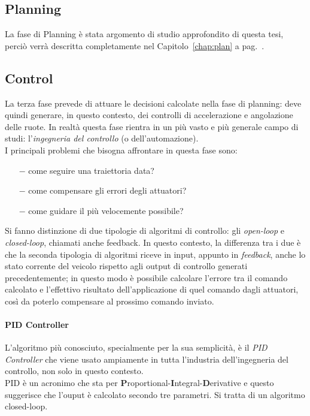 \subsection{Planning}
La fase di Planning è stata argomento di studio approfondito di questa tesi, perciò verrà descritta
completamente nel Capitolo~\ref{chap:plan} a pag.~\pageref{chap:plan}.

\subsection{Control}
La terza fase prevede di attuare le decisioni calcolate nella fase di planning: deve quindi generare, in
questo contesto, dei controlli di accelerazione e angolazione delle ruote. In realtà questa fase rientra
in un più vasto e più generale campo di studi: l'\textit{ingegneria del controllo} (o dell'automazione).\\
I principali problemi che bisogna affrontare in questa fase sono:
\begin{itemize}
	\setlength\itemsep{0em}
	\item[$-$] come seguire una traiettoria data?
	\item[$-$] come compensare gli errori degli attuatori?
	\item[$-$] come guidare il più velocemente possibile?
\end{itemize}
Si fanno distinzione di due tipologie di algoritmi di controllo: gli \textit{open-loop} e
\textit{closed-loop}, chiamati anche feedback. In questo contesto, la differenza tra i due è che la
seconda tipologia di algoritmi riceve in input, appunto in \textit{feedback}, anche lo stato corrente del
veicolo rispetto agli output di controllo generati precedentemente; in questo modo è possibile calcolare
l'errore tra il comando calcolato e l'effettivo risultato dell'applicazione di quel comando dagli
attuatori, così da poterlo compensare al prossimo comando inviato.

\paragraph{PID Controller} \cite{lection04, pid-wiki}
L'algoritmo più conosciuto, specialmente per la sua semplicità, è il \textit{PID Controller} che viene
usato ampiamente in tutta l'industria dell'ingegneria del controllo, non solo in questo contesto.\\
PID è un acronimo che sta per \textbf{P}roportional-\textbf{I}ntegral-\textbf{D}erivative e questo
suggerisce che l'ouput è calcolato secondo tre parametri. Si tratta di un algoritmo closed-loop.

